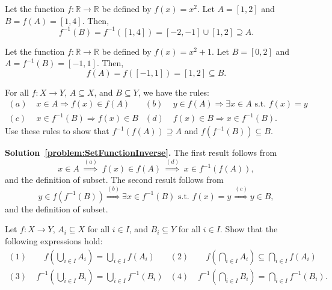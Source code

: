 \begin{example}
Let the function $f \colon \mathbb{R} \rightarrow \mathbb{R}$ be defined by $f(x)=x^2$. Let $A=[1,2]$ and $B = f(A) = [1,4]$.  Then,
\[ f^{-1}(B) = f^{-1}([1,4]) = [-2,-1] \cup [1,2] \supseteq A. \]
\end{example}
\begin{example}
Let the function $f \colon \mathbb{R} \rightarrow \mathbb{R}$ be defined by $f(x)=x^2+1$. Let $B=[0,2]$ and $A = f^{-1}(B) = [-1,1]$.  Then,
\[ f(A) = f([-1,1]) = [1,2] \subseteq B. \]
\end{example}

\begin{problem}
\label{problem:SetFunctionInverse}
For all $f:X\rightarrow Y$, $A\subseteq X$, and $B\subseteq Y$, we have the rules:
\begin{align*}
(a) & \; x \in A \Rightarrow f(x) \in f(A) &
(b) & \; y \in f(A) \Rightarrow \exists x\in A \textrm{ s.t. } f(x)=y \\
(c) & \; x\in f^{-1}(B) \Rightarrow f(x) \in B &
(d) & \; f(x) \in B \Rightarrow x\in f^{-1}(B) .
\end{align*}
Use these rules to show that $f^{-1}(f(A)) \supseteq A$ and $f(f^{-1}(B)) \subseteq B$.
\end{problem}
\noindent \textbf{Solution~\ref{problem:SetFunctionInverse}.}
The first result follows from
\[ x\in A \; \stackrel{(a)}{\Rightarrow} \; f(x)\in f(A) \; \stackrel{(d)}{\Rightarrow} \; x\in f^{-1}(f(A)), \]
and the definition of subset.
The second result follows from
\[ y\in f(f^{-1}(B)) \stackrel{(b)}{\Rightarrow} \exists x\in f^{-1}(B) \textrm{ s.t. } f(x)=y \, \stackrel{(c)}{\Rightarrow} y\in B, \]
and the definition of subset.

\begin{problem}
Let $f \colon X\rightarrow Y$, $A_i \subseteq X$ for all $i\in I$, and $B_i \subseteq Y$ for all $i\in I$.
Show that the following expressions hold:
\begin{align*}
(1) & \;\;\;\:\, f \left( \bigcup_{i\in I} A_i \right) = \bigcup_{i\in I} f \left( A_i \right) &
(2) & \;\;\;\:\, f \left( \bigcap_{i\in I} A_i \right) \subseteq \bigcap_{i\in I} f \left( A_i \right) \\
(3) & \; f^{-1} \left( \bigcup_{i\in I} B_i \right) = \bigcup_{i\in I} f^{-1} \left( B_i \right) &
(4) & \; f^{-1} \left( \bigcap_{i\in I} B_i \right) = \bigcap_{i\in I} f^{-1} \left( B_i \right). 
\end{align*}
\end{problem}

